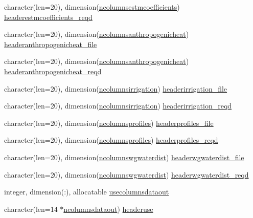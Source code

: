 \begin{DoxyCompactItemize}
character(len=20), dimension(\hyperlink{namespaceallocatearray_ab6963e51ec24ecb58c1ee21fd8a70654}{ncolumnsestmcoefficients}) \hyperlink{namespaceallocatearray_ae236b7dc5f2a5772c73b7f382f618cb5}{headerestmcoefficients\+\_\+reqd}
\item 
character(len=20), dimension(\hyperlink{namespaceallocatearray_aa1105086801cd6c5c6be1d9563c93341}{ncolumnsanthropogenicheat}) \hyperlink{namespaceallocatearray_a79c2984467ad2372c14bf2b1bab91392}{headeranthropogenicheat\+\_\+file}
\item 
character(len=20), dimension(\hyperlink{namespaceallocatearray_aa1105086801cd6c5c6be1d9563c93341}{ncolumnsanthropogenicheat}) \hyperlink{namespaceallocatearray_aa4b6448bbb7e330b4d44bedbc6ca04fd}{headeranthropogenicheat\+\_\+reqd}
\item 
character(len=20), dimension(\hyperlink{namespaceallocatearray_ae577fdefdd007ae24a4d46e52bbcd217}{ncolumnsirrigation}) \hyperlink{namespaceallocatearray_abdd6fb7f3cb84c748a69991e7238514b}{headerirrigation\+\_\+file}
\item 
character(len=20), dimension(\hyperlink{namespaceallocatearray_ae577fdefdd007ae24a4d46e52bbcd217}{ncolumnsirrigation}) \hyperlink{namespaceallocatearray_a954868db4fef915c78d7daa2ba68e8dc}{headerirrigation\+\_\+reqd}
\item 
character(len=20), dimension(\hyperlink{namespaceallocatearray_a505dab229d9725bdbe44d06de37dceba}{ncolumnsprofiles}) \hyperlink{namespaceallocatearray_ab80c29dab9c61373913b3adab5decbc9}{headerprofiles\+\_\+file}
\item 
character(len=20), dimension(\hyperlink{namespaceallocatearray_a505dab229d9725bdbe44d06de37dceba}{ncolumnsprofiles}) \hyperlink{namespaceallocatearray_a54f6a31f434560c3e13bd7835a1bffd8}{headerprofiles\+\_\+reqd}
\item 
character(len=20), dimension(\hyperlink{namespaceallocatearray_a85d1a0c9782006900e2d2a379ba269c8}{ncolumnswgwaterdist}) \hyperlink{namespaceallocatearray_a1dc4be815337cd033a0c06090ecd9d45}{headerwgwaterdist\+\_\+file}
\item 
character(len=20), dimension(\hyperlink{namespaceallocatearray_a85d1a0c9782006900e2d2a379ba269c8}{ncolumnswgwaterdist}) \hyperlink{namespaceallocatearray_af07ba3471074023fae170857b69c2a4e}{headerwgwaterdist\+\_\+reqd}
\item 
integer, dimension(\+:), allocatable \hyperlink{namespaceallocatearray_a66aee2b0878cf1d1cc5502cef18967b4}{usecolumnsdataout}
\item 
character(len=14 $\ast$\hyperlink{namespaceallocatearray_a9408900bed6c87ed095d2c688c1506a0}{ncolumnsdataout}) \hyperlink{namespaceallocatearray_a62706bdf1d2b60377a7e57313210e520}{headeruse}

\end{DoxyCompactItemize}
